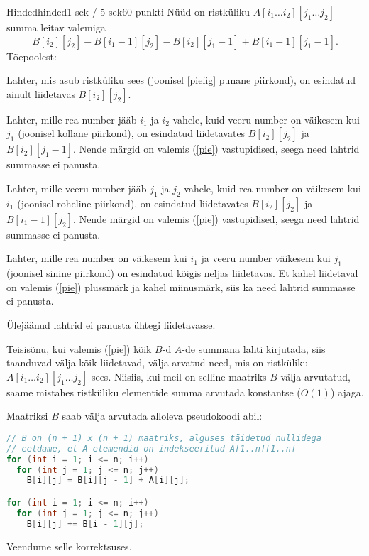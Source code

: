 \begin{yl}{5}{Hinded}{hinded}{1 sek / 5 sek}{60 punkti}
  Nüüd on ristküliku $A[i_1 \ldots i_2][j_1 \ldots j_2]$ summa leitav valemiga
  \begin{equation} \label{pie}
    B[i_2][j_2] - B[i_1 - 1][j_2] - B[i_2][j_1 - 1] + B[i_1 - 1][j_1 - 1].
  \end{equation}
  Tõepoolest:
  \begin{xitem}
  \item Lahter, mis asub ristküliku sees (joonisel \ref{piefig} punane piirkond), on
    esindatud ainult liidetavas $B[i_2][j_2]$.
  \item Lahter, mille rea number jääb $i_1$ ja $i_2$ vahele,
    kuid veeru number on väikesem
    kui $j_1$ (joonisel kollane piirkond), on esindatud liidetavates $B[i_2][j_2]$ ja
    $B[i_2][j_1 - 1]$. Nende märgid
    on valemis (\ref{pie}) vastupidised, seega need lahtrid summasse ei panusta.
  \item Lahter, mille veeru number jääb $j_1$ ja $j_2$ vahele,
    kuid rea number on väikesem
    kui $i_1$ (joonisel roheline piirkond), on esindatud liidetavates
    $B[i_2][j_2]$ ja $B[i_1 - 1][j_2]$. Nende märgid
    on valemis (\ref{pie}) vastupidised, seega need lahtrid summasse ei panusta.
  \item Lahter, mille rea number on väikesem kui $i_1$ ja veeru number väikesem kui $j_1$
    (joonisel sinine piirkond)
    on esindatud kõigis neljas liidetavas. Et kahel liidetaval on valemis (\ref{pie})
    plussmärk ja kahel miinusmärk, siis ka need lahtrid summasse ei panusta.
  \item Ülejäänud lahtrid ei panusta ühtegi liidetavasse.
  \end{xitem}

  Teisisõnu, kui valemis (\ref{pie}) kõik $B$-d $A$-de summana lahti kirjutada, siis
  taanduvad välja kõik liidetavad, välja arvatud need, mis on ristküliku $A[i_1 \ldots i_2][j_1 \ldots j_2]$ sees.
  Niisiis, kui meil on selline maatriks $B$ välja arvutatud, saame mistahes
  ristküliku elementide summa arvutada konstantse ($O(1)$) ajaga.

  \clearpage
  Maatriksi $B$ saab välja arvutada alloleva pseudokoodi abil:
\begin{lstlisting}[language=C++]
// B on (n + 1) x (n + 1) maatriks, alguses täidetud nullidega
// eeldame, et A elemendid on indekseeritud A[1..n][1..n]
for (int i = 1; i <= n; i++)
  for (int j = 1; j <= n; j++)
    B[i][j] = B[i][j - 1] + A[i][j];

for (int i = 1; i <= n; i++)
  for (int j = 1; j <= n; j++)
    B[i][j] += B[i - 1][j];
\end{lstlisting}
  Veendume selle korrektsuses.


\end{yl}
